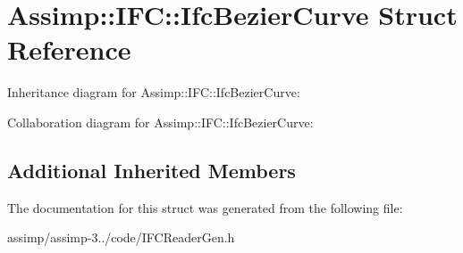 \hypertarget{struct_assimp_1_1_i_f_c_1_1_ifc_bezier_curve}{\section{Assimp\+:\+:I\+F\+C\+:\+:Ifc\+Bezier\+Curve Struct Reference}
\label{struct_assimp_1_1_i_f_c_1_1_ifc_bezier_curve}
}


Inheritance diagram for Assimp\+:\+:I\+F\+C\+:\+:Ifc\+Bezier\+Curve\+:


Collaboration diagram for Assimp\+:\+:I\+F\+C\+:\+:Ifc\+Bezier\+Curve\+:
\subsection*{Additional Inherited Members}


The documentation for this struct was generated from the following file\+:\begin{DoxyCompactItemize}
\item 
assimp/assimp-\/3../code/I\+F\+C\+Reader\+Gen.\+h\end{DoxyCompactItemize}
